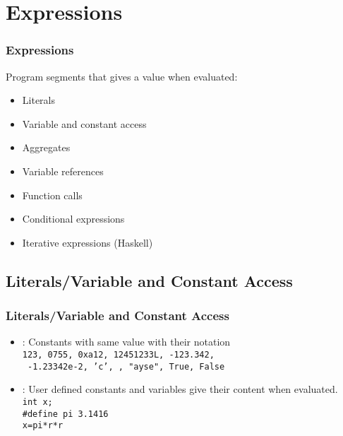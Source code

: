 \section{Expressions}
\begin{frame}
\frametitle{Expressions}
 Program segments that gives a value when evaluated:
\begin{itemize}
	\item Literals
	\item Variable and constant access
	\item Aggregates
	\item Variable references
	\item Function calls
	\item Conditional expressions
	\item Iterative expressions (Haskell)
\end{itemize}
\end{frame}

\subsection{Literals/Variable and Constant Access}
\begin{frame}
\frametitle{Literals/Variable and Constant Access}
\begin{itemize}
 \item {}: Constants with same value with their notation\\
 \texttt{123, 0755, 0xa12, 12451233L, -123.342,}\\
\texttt{ -1.23342e-2, 'c', , "ayse", True, False}
 \item {}: User defined constants and variables give their
 content when evaluated.\\
\texttt{int x; }\\
\texttt{\#define pi 3.1416}\\
\texttt{\textsf{x}=\textsf{pi}*\textsf{r}*\textsf{r}}
\end{itemize}
\end{frame}


